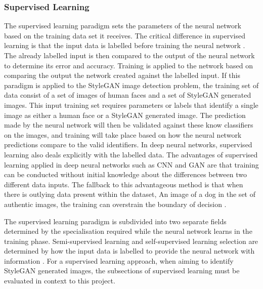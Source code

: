 \subsubsection{Supervised Learning}

The supervised learning paradigm sets the parameters of the neural network based on the training data set it receives. The critical difference in supervised learning is that the input data is labelled before training the neural network \citep{Krenker2011, OShea2015}. The already labelled input is then compared to the output of the neural network to determine its error and accuracy. Training is applied to the network based on comparing the output the network created against the labelled input. If this paradigm is applied to the StyleGAN image detection problem, the training set of data consist of a set of images of human faces and a set of StyleGAN generated images. This input training set requires parameters or labels that identify a single image as either a human face or a StyleGAN generated image. The prediction made by the neural network will then be validated against these know classifiers on the images, and training will take place based on how the neural network predictions compare to the valid identifiers. In deep neural networks, supervised learning also deals explicitly with the labelled data. The advantages of supervised learning applied in deep neural networks such as CNN and GAN are that training can be conducted without initial knowledge about the differences between two different data inputs. The fallback to this advantageous method is that when there is outlying data present within the dataset, An image of a dog in the set of authentic images, the training can overstrain the boundary of decision \citep{Alzubaidi2021}.

The supervised learning paradigm is subdivided into two separate fields determined by the specialisation required while the neural network learns in the training phase. Semi-supervised learning and self-supervised learning selection are determined by how the input data is labelled to provide the neural network with information \citep{Zhai}. For a supervised learning approach, when aiming to identify StyleGAN generated images, the subsections of supervised learning must be evaluated in context to this project. 

